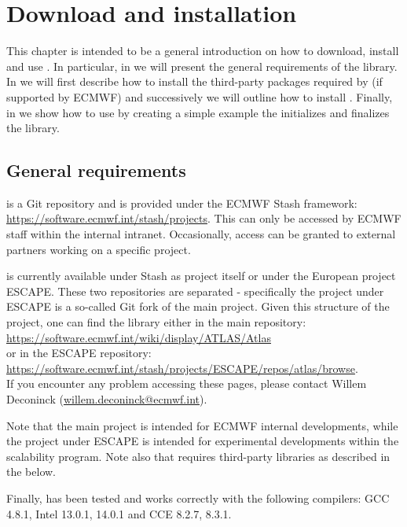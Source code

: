 \chapter{Download and installation}
\label{chap:installation}
This chapter is intended to be a general introduction 
on how to download, install and use \Atlas. In particular, 
in  we will present the general 
requirements of the library. In  we 
will first describe how to install the third-party packages 
required by \Atlas (if supported by ECMWF) and successively 
we will outline how to install \Atlas. Finally, in 
we show how to use \Atlas by creating a simple example the 
initializes and finalizes the library.


\section{General requirements}
\label{s:requirements}

\Atlas is a Git repository and is provided under the ECMWF Stash 
framework: \url{https://software.ecmwf.int/stash/projects}. This 
can only be accessed by ECMWF staff within the internal intranet.
Occasionally, access can be granted to external partners working 
on a specific project.

\Atlas is currently available under Stash as \Atlas project 
itself or under the European project ESCAPE. These two repositories 
are separated - specifically the \Atlas project under ESCAPE is 
a so-called Git fork of the main \Atlas project.
Given this structure of the \Atlas project, one can find the 
library either in the main repository:\\
\url{https://software.ecmwf.int/wiki/display/ATLAS/Atlas}\\
or in the ESCAPE repository:\\
\url{https://software.ecmwf.int/stash/projects/ESCAPE/repos/atlas/browse}.\\
If you encounter any problem accessing these pages, please contact 
Willem Deconinck (\url{willem.deconinck@ecmwf.int}).

Note that the main \Atlas project is intended for ECMWF internal 
developments, while the \Atlas project under ESCAPE is intended 
for experimental developments within the scalability program.
Note also that \Atlas requires third-party libraries as described 
in the  below.

Finally, \Atlas has been tested and works correctly with the 
following compilers: GCC 4.8.1, Intel 13.0.1, 14.0.1 and CCE 
8.2.7, 8.3.1.



